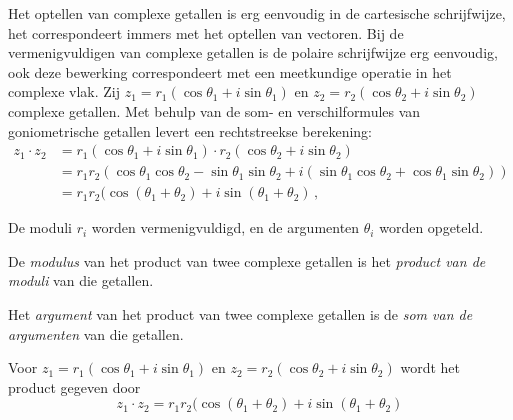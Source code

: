 \documentclass{ximera}
\begin{document}
    \author{Wiskunde Op Maat }
     
    \label{xim:complexe_getallen_polair}  %

  

Het optellen van complexe getallen is erg eenvoudig in de cartesische schrijfwijze, het correspondeert immers met het optellen van vectoren. 
Bij de vermenigvuldigen van complexe getallen is de polaire schrijfwijze erg eenvoudig, ook deze bewerking correspondeert met een meetkundige operatie in het complexe vlak. 
Zij $z_1=r_1 (\cos \theta_1 + i \sin \theta_1 ) $ en $z_2 = r_2(\cos \theta_2 + i \sin \theta_2 )$ complexe getallen. Met behulp van de som- en verschilformules van goniometrische getallen levert een rechtstreekse berekening: 
\begin{align*}
    z_1\cdot z_2 &= r_1 (\cos \theta_1 + i \sin \theta_1 )\cdot r_2 (\cos\theta_2 + i \sin \theta_2 )\\
                 &= r_1 r_2 (\cos \theta_1 \cos \theta_2 - \sin \theta_1  \sin\theta_2 + i(\sin \theta_1 \cos \theta_2 + \cos \theta_1  \sin
    \theta_2 ))\\
                 &= r_1 r_2 ( \cos(\theta_1 + \theta_2) + i \sin(\theta_1 + \theta_2) \, ,
\end{align*}


De moduli $r_i$ worden vermenigvuldigd, en de argumenten $\theta_i$ worden opgeteld.
 
\begin{proposition}\label{eig:vermenigvuldiging_complexe_getallen}\nl
     
De \textit{modulus} van het product van twee complexe getallen is het \textit{product van de moduli} van die getallen.
 
Het \textit{argument} van het product van twee complexe getallen is de \textit{som van de argumenten} van die getallen.

Voor \( z_1 = r_1 (\cos \theta_1 + i \sin \theta_1 )\) en \(z_2 = r_2 (\cos\theta_2 + i \sin \theta_2 )\) wordt het product gegeven door  \[ z_1 \cdot z_2 = r_1 r_2 ( \cos(\theta_1 + \theta_2) + i \sin(\theta_1 + \theta_2) \]
\end{proposition}
 
\end{document}
